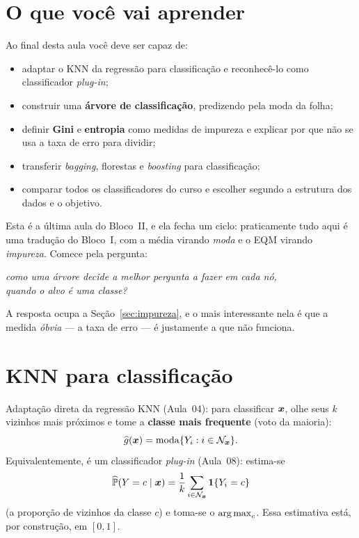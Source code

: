 \documentclass[11pt,a4paper]{article}
\title{}
\date{}
\begin{document}

\section*{O que você vai aprender}
Ao final desta aula você deve ser capaz de:
\begin{itemize}[leftmargin=1.4cm]
  \item adaptar o KNN da regressão para classificação e reconhecê-lo como
        classificador \emph{plug-in};
  \item construir uma \textbf{árvore de classificação}, predizendo pela moda da
        folha;
  \item definir \textbf{Gini} e \textbf{entropia} como medidas de impureza e
        explicar por que não se usa a taxa de erro para dividir;
  \item transferir \emph{bagging}, florestas e \emph{boosting} para classificação;
  \item comparar todos os classificadores do curso e escolher segundo a estrutura
        dos dados e o objetivo.
\end{itemize}

\noindent
Esta é a última aula do Bloco~II, e ela fecha um ciclo: praticamente tudo aqui é
uma tradução do Bloco~I, com a média virando \emph{moda} e o EQM virando
\emph{impureza}. Comece pela pergunta:

\begin{center}\itshape
  como uma árvore decide a melhor pergunta a fazer em cada nó,\\
  quando o alvo é uma classe?
\end{center}

\noindent
A resposta ocupa a Seção~\ref{sec:impureza}, e o mais interessante nela é que a
medida \emph{óbvia} --- a taxa de erro --- é justamente a que não funciona.

\section{KNN para classificação}
Adaptação direta da regressão KNN (Aula~04): para classificar $\bm{x}$, olhe seus $k$
vizinhos mais próximos e tome a \textbf{classe mais frequente} (voto da maioria):
\begin{equation}\label{eq:knncls}
  \widehat{g}(\bm{x}) = \operatorname{moda}\{Y_i : i\in\mathcal{N}_{\bm{x}}\}.
\end{equation}
Equivalentemente, é um classificador \emph{plug-in} (Aula~08): estima-se
\[
  \widehat{\mathbb{P}}(Y=c\mid\bm{x}) = \frac{1}{k}\sum_{i\in\mathcal{N}_{\bm{x}}}\mathbf{1}\!\left\{Y_i=c\right\}
\]
(a proporção de vizinhos da classe $c$) e toma-se o $\argmax_c$. Essa estimativa
está, por construção, em $[0,1]$.
\end{document}
